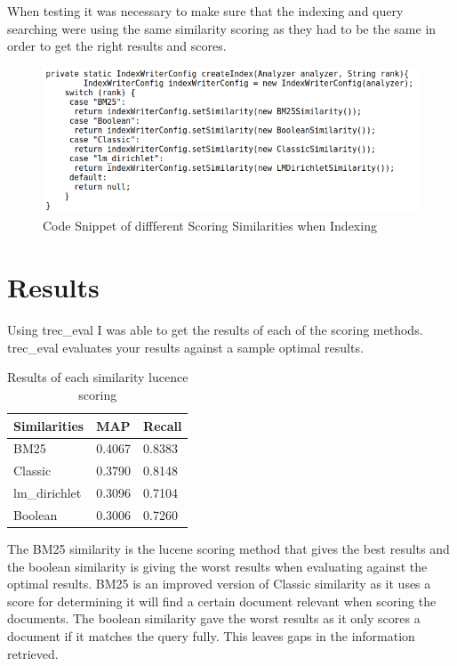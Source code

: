 When testing it was necessary to make sure that the indexing and query searching were using the same similarity scoring as they had to be the same in order to get the right results and scores. \par
 
	\begin{figure}[ht!]
		\begin{center}
			\includegraphics[scale=.35 ]{3} 
			\caption{Code Snippet of diffferent Scoring Similarities when Indexing}
			\label{fig:1}
		\end{center}
	\end{figure} \par



\section{Results}
Using trec\_eval I was able to get the results of each of the scoring methods. trec\_eval evaluates your results against a sample optimal results. \newline 


\begin{table}[H]
	\centering
	\begin{tabular}{|p{1.5cm}|p{1.25cm}|p{1.25cm}|}
	\hline Similarities & MAP  & Recall \\ \hline
			BM25 					& 0.4067  & 0.8383 \\ \hline
			Classic 				& 0.3790  & 0.8148 \\ \hline
			lm\_dirichlet 			& 0.3096  & 0.7104 \\ \hline
			Boolean 				& 0.3006  & 0.7260 \\ \hline
			
	\end{tabular} 
	\caption{Results of each similarity lucence scoring}
	\label{table:results}
\end{table}
	
\newpage	
The BM25 similarity is the lucene scoring method that gives the best results and the boolean similarity is giving the worst results when evaluating against the optimal results.  BM25 is an improved version of Classic similarity as it uses a score for determining it will find a certain document relevant when scoring the documents. The boolean similarity gave the worst results as it only scores a document if it matches the query fully. This leaves gaps in the information retrieved. \par 

